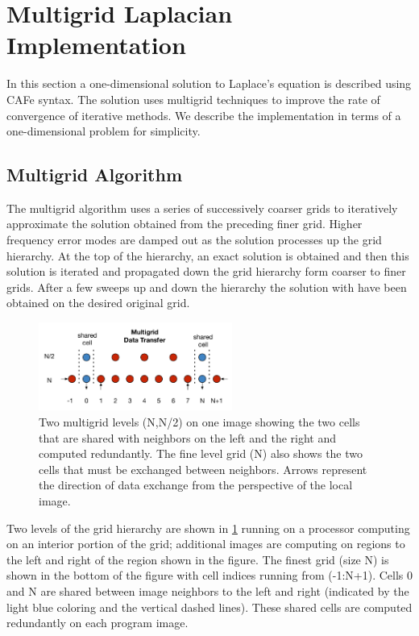 \section{Multigrid Laplacian Implementation}

In this section a one-dimensional solution to Laplace's equation is described using CAFe
syntax.  The solution uses multigrid techniques to improve the rate of convergence
of iterative methods.  We describe the implementation in terms of a one-dimensional
problem for simplicity.

\subsection{Multigrid Algorithm}

The multigrid algorithm uses a series of successively coarser grids to
iteratively approximate the solution obtained from the preceding
finer grid.  Higher frequency error modes are damped out as the
solution processes up the grid hierarchy.  At the top of the
hierarchy, an exact solution is obtained and then this solution is
iterated and propagated down the grid hierarchy form coarser to finer
grids.  After a few sweeps up and down the hierarchy the solution with
have been obtained on the desired original grid.

\begin{figure}[!t]
\centering
\includegraphics[width=2.5in]{Fig1}
\caption{Two multigrid levels (N,N/2) on one image showing the two cells that are shared with
  neighbors on the left and the right and computed redundantly.  The fine level grid (N)
  also shows the two cells that must be exchanged between neighbors.  Arrows represent the direction
  of data exchange from the perspective of the local image.}
\label{fig_grids}
\end{figure}

Two levels of the grid hierarchy are shown in \ref{fig_grids} running on a processor computing on
an interior portion of the grid; additional images are computing on regions to the left and right of
the region shown in the figure.  The finest grid (size N) is shown
in the bottom of the figure with cell indices running from (-1:N+1).  Cells 0 and N are shared
between image neighbors to the left and right (indicated by the light blue coloring and the vertical
dashed lines).  These shared cells are computed redundantly on each program image.

